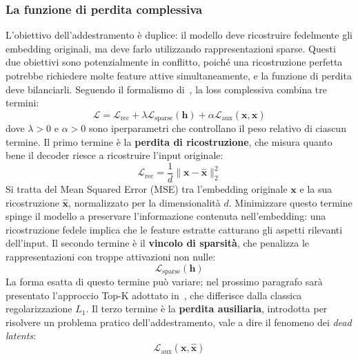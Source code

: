 \subsubsection{La funzione di perdita complessiva}
\label{subsubsec:loss_overview}
L'obiettivo dell'addestramento è duplice: il modello deve ricostruire fedelmente gli embedding originali, ma deve farlo utilizzando rappresentazioni sparse. Questi due obiettivi sono potenzialmente in conflitto, poiché una ricostruzione perfetta potrebbe richiedere molte feature attive simultaneamente, e la funzione di perdita deve bilanciarli.
Seguendo il formalismo di~\parencite{oneill2024disentangling}, la loss complessiva combina tre termini:
\begin{equation}
    \mathcal{L} = \mathcal{L}_{\text{rec}} + \lambda \mathcal{L}_{\text{sparse}}(\mathbf{h}) + \alpha \mathcal{L}_{\text{aux}}(\mathbf{x}, \hat{\mathbf{x}})
    \label{eq:total_loss}
\end{equation}
dove $\lambda > 0$ e $\alpha > 0$ sono iperparametri che controllano il peso relativo di ciascun termine.
Il primo termine è la \textbf{perdita di ricostruzione}, che misura quanto bene il decoder riesce a ricostruire l'input originale:
\begin{equation}
    \mathcal{L}_{\text{rec}} = \frac{1}{d} \|\mathbf{x} - \hat{\mathbf{x}}\|_2^2
    \label{eq:reconstruction_loss}
\end{equation}
Si tratta del Mean Squared Error (MSE) tra l'embedding originale $\mathbf{x}$ e la sua ricostruzione $\hat{\mathbf{x}}$, normalizzato per la dimensionalità $d$. Minimizzare questo termine spinge il modello a preservare l'informazione contenuta nell'embedding: una ricostruzione fedele implica che le feature estratte catturano gli aspetti rilevanti dell'input.
Il secondo termine è il \textbf{vincolo di sparsità}, che penalizza le rappresentazioni con troppe attivazioni non nulle:
\begin{equation}
    \mathcal{L}_{\text{sparse}}(\mathbf{h})
\end{equation}
La forma esatta di questo termine può variare; nel prossimo paragrafo sarà presentato l'approccio Top-K adottato in~\parencite{oneill2024disentangling}, che differisce dalla classica regolarizzazione $L_1$.
Il terzo termine è la \textbf{perdita ausiliaria}, introdotta per risolvere un problema pratico dell'addestramento, vale a dire il fenomeno dei \textit{dead latents}:
\begin{equation}
    \mathcal{L}_{\text{aux}}(\mathbf{x}, \hat{\mathbf{x}})
\end{equation}

